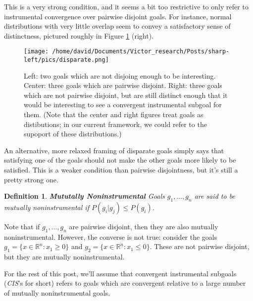 \documentclass{article}
\newtheorem{definition}{Definition}
\begin{document}
This is a very strong condition, and it seems a bit too restrictive to only refer to instrumental convergence over pairwise disjoint goals. For instance, normal distributions with very little overlap seem to convey a satisfactory sense of distinctness, pictured roughly in Figure \ref{fig:disparate} (right).

\begin{figure}[ht]
    \centering
    \texttt{[image: /home/david/Documents/Victor\_research/Posts/sharp-left/pics/disparate.png]} 
    \caption{Left: two goals which are not disjoing enough to be interesting. Center: three goals which are pairwise disjoint. Right: three goals which are not pairwise disjoint, but are still distinct enough that it would be interesting to see a convergent instrumental subgoal for them. (Note that the center and right figures treat goals as distibutions; in our current framework, we could refer to the supoport of these distributions.)}
    \label{fig:disparate} 
\end{figure}

An alternative, more relaxed framing of disparate goals simply says that satisfying one of the goals should not make the other goals more likely to be satisfied. This is a weaker condition than pairwise disjointness, but it's still a pretty strong one.

\begin{definition}{\textbf{Mututally Noninstrumental}}
    Goals $g_1, \dots, g_n$ are said to be \emph{mutually noninstrumental} if $P(g_i|g_j)\le P(g_i)$.
\end{definition}

Note that if $g_1, \dots, g_n$ are pairwise disjoint, then they are also mutually noninstrumental. However, the converse is not true: consider the goals $g_1=\{x\in\mathbb{R}^n: x_1\ge 0\}$ and $g_2=\{x\in\mathbb{R}^n: x_1\le 0\}$. These are not pairwise disjoint, but they are mutually noninstrumental.

For the rest of this post, we'll assume that convergent instrumental subgoals (\emph{CIS}'s for short) refers to goals which are convergent relative to a large number of mutually noninstrumental goals. 

\end{document}

